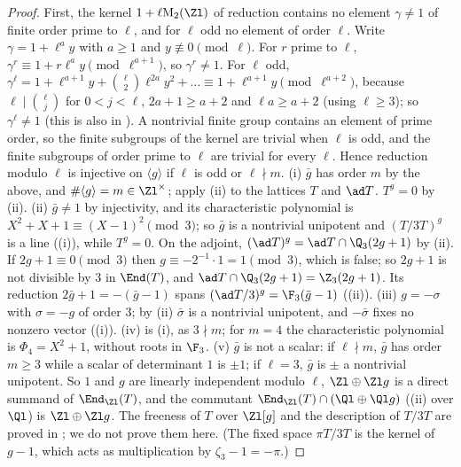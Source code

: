 \begin{proof}
First, the kernel $1+\ell\mathrm M_2(\Zl)$ of reduction contains no element $\gamma\ne1$ of finite order prime to $\ell$, and for $\ell$ odd no element of order $\ell$.
Write $\gamma=1+\ell^ay$ with $a\ge1$ and $y\not\equiv0\pmod\ell$. For $r$ prime to $\ell$, $\gamma^r\equiv1+r\ell^ay\pmod{\ell^{a+1}}$, so $\gamma^r\ne1$. For $\ell$ odd,
$\gamma^\ell=1+\ell^{a+1}y+\binom\ell2\ell^{2a}y^2+\dots\equiv1+\ell^{a+1}y\pmod{\ell^{a+2}}$, because $\ell\mid\binom\ell j$ for $0<j<\ell$, $2a+1\ge a+2$ and $\ell a\ge a+2$ (using
$\ell\ge3$); so $\gamma^\ell\ne1$ (this is also in ). A nontrivial finite group contains an element of prime order, so the finite
subgroups of the kernel are trivial when $\ell$ is odd, and the finite subgroups of order prime to $\ell$ are trivial for every $\ell$. Hence
reduction modulo $\ell$ is injective on $\langle g\rangle$ if $\ell$ is odd or $\ell\nmid m$.
(i) $\bar g$ has order $m$ by the above, and $\#\langle g\rangle=m\in\Zl^\times$; apply (ii) to the lattices $T$ and $\ad T$. $T^g=0$ by
(ii).
(ii) $\bar g\ne1$ by injectivity, and its characteristic polynomial is $X^2+X+1\equiv(X-1)^2\pmod3$; so $\bar g$ is a nontrivial unipotent and
$(T/3T)^g$ is a line ((i)), while $T^g=0$. On the adjoint, $(\ad T)^g=\ad T\cap\Q_3(2g+1)$ by
(ii). If $2g+1\equiv0\pmod3$ then $g\equiv-2^{-1}\cdot1=1\pmod 3$, which is false; so $2g+1$ is not divisible by $3$ in $\End(T)$, and
$\ad T\cap\Q_3(2g+1)=\Z_3(2g+1)$. Its reduction $2\bar g+1=-(\bar g-1)$ spans $(\ad T/3)^g=\F_3(\bar g-1)$ ((ii)).
(iii) $g=-\sigma$ with $\sigma=-g$ of order $3$; by (ii) $\bar\sigma$ is a nontrivial unipotent, and $-\bar\sigma$ fixes no nonzero vector
((i)).
(iv) is (i), as $3\nmid m$; for $m=4$ the characteristic polynomial is $\Phi_4=X^2+1$, without roots in $\F_3$.
(v) $\bar g$ is not a scalar: if $\ell\nmid m$, $\bar g$ has order $m\ge3$ while a scalar of determinant $1$ is $\pm1$; if $\ell=3$, $\bar g$ is $\pm$ a nontrivial
unipotent. So $1$ and $g$ are linearly independent modulo $\ell$, $\Zl\oplus\Zl g$ is a direct summand of $\End_{\Zl}(T)$, and the commutant
$\End_{\Zl}(T)\cap(\Ql\oplus\Ql g)$ ((ii) over $\Ql$) is $\Zl\oplus\Zl g$. The freeness of $T$ over $\Zl[g]$ and the description of
$T/3T$ are proved in ; we do not prove them here. (The fixed space $\pi T/3T$ is the kernel of $g-1$, which acts as multiplication by $\zeta_3-1=-\pi$.)
\end{proof}

